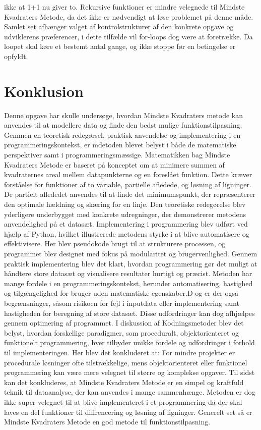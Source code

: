 ikke at 1+1 nu giver to. Rekursive funktioner er mindre velegnede til Mindste Kvadraters Metode, da det ikke er nødvendigt at løse problemet på denne måde. Samlet set afhænger valget af kontrolstrukturer af den konkrete opgave og udviklerens præferencer, i dette tilfælde vil for-loops dog være at foretrække. Da loopet skal køre et bestemt antal gange, og ikke stoppe før en betingelse er opfyldt.

\section{Konklusion}
Denne opgave har skulle undersøge, hvordan Mindste Kvadraters metode kan anvendes til at modellere data og finde den bedst mulige funktionstilpasning. Gemmen en teoretisk redegørsel, praktisk anvendelse og implementering i en programmeringskontekst, er mdetoden blevet belyst i både de matematiske perspektiver samt i programmeringsmæssige. Matematikken bag Mindste Kvadraters Metode er baseret på konceptet om at minimere summen af kvadraternes areal mellem datapunkterne og en foreslået funktion. Dette kræver forståelse for funktioner af to variable, partielle afledede, og løsning af ligninger. De partielt aflededet anvendes til at finde det minimumspunkt, der repræsenterer den optimale hældning og skæring for en linje. Den teoretiske redegørelse blev yderligere underbygget med konkrete udregninger, der demonstrerer metodens anvendelighed på et datasæt. Implementering i programmering blev udført ved hjælp af Python, hvilket illustrerede metodens styrke i at blive automatisere og effektivisere. Her blev pseudokode brugt til at strukturere processen, og programmet blev designet med fokus på modularitet og brugervenlighed. Gennem praktisk implementering blev det klart, hvordan programmering gør det muligt at håndtere store datasæt og visualisere resultater hurtigt og præcist. Metoden har mange fordele i en programmeringskontekst, herunder automatisering, hastighed og tilgængelighed for bruger uden matematiske egenskaber.D og er der også begrænsninger, såsom risikoen for fejl i inputdata eller implementering samt hastigheden for beregning af store datasæt. Disse udfordringer kan dog afhjælpes gennem optimering af programmet. I diskussion af Kodningsmetoder blev det belyst, hvordan forskellige paradigmer, som proceduralt, objektorienteret og funktionelt programmering, hver tilbyder unikke fordele og udfordringer i forhold til implementeringen. Her blev det konkluderet at: For mindre projekter er procedurale løsninger ofte tilstrækkelige, mens objektorienteret eller funktionel programmering kan være mere velegnet til større og komplekse opgaver. Til sidst kan det konkluderes, at Mindste Kvadraters Metode er en simpel og kraftfuld teknik til dataanalyse, der kan anvendes i mange sammenhænge. Metoden er dog ikke super velegnet til at blive implementeret i et programmering da der skal laves en del funktioner til diffrencering og løsning af ligninger. Generelt set så er Mindste Kvadraters Metode en god metode til funktionstilpasning.